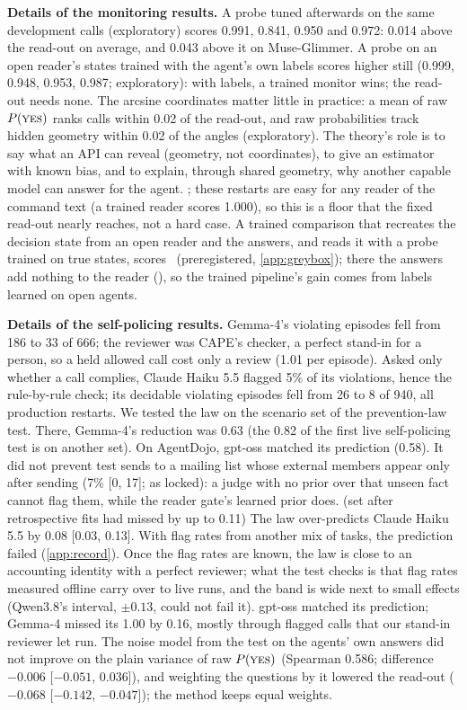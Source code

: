 \textbf{Details of the monitoring results.} A probe tuned afterwards on the same development calls (exploratory) scores 0.991, 0.841, 0.950 and 0.972: 0.014 above the read-out on average, and 0.043 above it on Muse-Glimmer. A probe on an open reader's states trained with the agent's own labels scores higher still (0.999, 0.948, 0.953, 0.987; exploratory): with labels, a trained monitor wins; the read-out needs none. The arcsine coordinates matter little in practice: a mean of raw $P(\textsc{yes})$ ranks calls within 0.02 of the read-out, and raw probabilities track hidden geometry within 0.02 of the angles (exploratory). The theory's role is to say what an API can reveal (geometry, not coordinates), to give an estimator with known bias, and to explain, through shared geometry, why another capable model can answer for the agent. ; these restarts are easy for any reader of the command text (a trained reader scores 1.000), so this is a floor that the fixed read-out nearly reaches, not a hard case. A trained comparison that recreates the decision state from an open reader and the answers, and reads it with a probe trained on true states, scores \GFtGrey\ (preregistered, \cref{app:greybox}); there the answers add nothing to the reader (\GFtPthree), so the trained pipeline's gain comes from labels learned on open agents.

\textbf{Details of the self-policing results.} Gemma-4's violating episodes fell from 186 to 33 of 666; the reviewer was CAPE's checker, a perfect stand-in for a person, so a held allowed call cost only a review (1.01 per episode). Asked only whether a call complies, Claude Haiku 5.5 flagged 5\% of its violations, hence the rule-by-rule check; its decidable violating episodes fell from 26 to 8 of 940, all production restarts. We tested the law on the scenario set of the prevention-law test. There, Gemma-4's reduction was 0.63 (the 0.82 of the first live self-policing test is on another set). On AgentDojo, gpt-oss matched its prediction (0.58). It did not prevent test sends to a mailing list whose external members appear only after sending (7\% [0, 17]; as locked): a judge with no prior over that unseen fact cannot flag them, while the reader gate's learned prior does. (set after retrospective fits had missed by up to 0.11) The law over-predicts Claude Haiku 5.5 by 0.08 [0.03, 0.13]. With flag rates from another mix of tasks, the prediction failed (\cref{app:record}). Once the flag rates are known, the law is close to an accounting identity with a perfect reviewer; what the test checks is that flag rates measured offline carry over to live runs, and the band is wide next to small effects (Qwen3.8's interval, $\pm0.13$, could not fail it). gpt-oss matched its prediction; Gemma-4 missed its 1.00 by 0.16, mostly through flagged calls that our stand-in reviewer let run. The noise model from the test on the agents' own answers did not improve on the plain variance of raw $P(\textsc{yes})$ (Spearman 0.586; difference $-0.006$ [$-0.051$, 0.036]), and weighting the questions by it lowered the read-out ($-0.068$ [$-0.142$, $-0.047$]); the method keeps equal weights.


